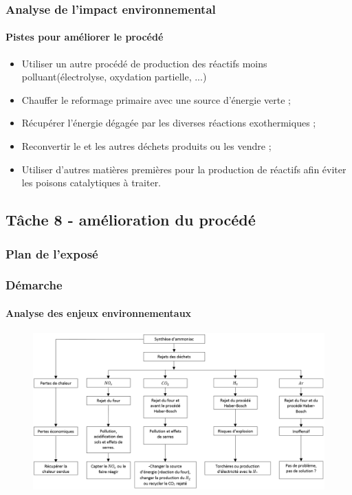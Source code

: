 \documentclass{beamer}
\begin{document}
	\begin{frame}
	\frametitle{Analyse de l'impact environnemental}
	\framesubtitle{Pistes pour améliorer le procédé}
	\begin{itemize}
		\item Utiliser un autre procédé de production des réactifs moins polluant(électrolyse, oxydation partielle, ...)
		\item Chauffer le reformage primaire avec une source d'énergie verte ;
		\item Récupérer l'énergie dégagée par les diverses réactions exothermiques ;
		\item Reconvertir le  et les autres déchets produits ou les vendre ;
		\item Utiliser d'autres matières premières pour la production de réactifs afin éviter les poisons catalytiques à traiter.
	\end{itemize}
	\end{frame}
	
	\begin{frame}
		\section{Tâche 8 - amélioration du procédé}
		\frametitle{Plan de l'exposé}
		\tableofcontents[currentsubsection,sectionstyle=show/shaded,subsectionstyle=show/shaded/hide]
	\end{frame}
	
	\begin{frame}
		\frametitle{Démarche}
		\framesubtitle{Analyse des enjeux environnementaux}
		\begin{figure}
			\centering
			\includegraphics[scale=0.40]{media/mindmap.png}
		\end{figure}
	\end{frame}
	
\end{document}
